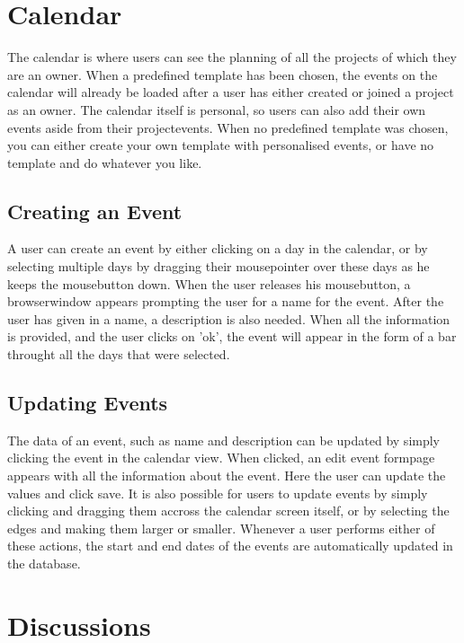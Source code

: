 \section{Calendar}

The calendar is where users can see the planning of all the projects of which they are an owner.
When a predefined template has been chosen, the events on the calendar will already be loaded after
a user has either created or joined a project as an owner. The calendar itself is personal, so users can also add their own events aside from their 
projectevents. When no predefined template was chosen, you can either
create your own template with personalised events, or have no template and do whatever you like.

\subsection{Creating an Event}

A user can create an event by either clicking on a day in the calendar, or by selecting multiple days by dragging their mousepointer over these days
as he keeps the mousebutton down. When the user releases his mousebutton, a browserwindow appears prompting the user for a name for the event. After
the user has given in a name, a description is also needed. When all the information is provided, and the user clicks on 'ok', the event will appear
in the form of a bar throught all the days that were selected.

\subsection{Updating Events}

The data of an event, such as name and description can be updated by simply clicking the event in the calendar view. When clicked, an edit event 
formpage appears with all the information about the event. Here the user can update the values and click save. It is also possible for users
to update events by simply clicking and dragging them accross the calendar screen itself, or by selecting the edges and making them larger or
smaller. Whenever a user performs either of these actions, the start and end dates of the events are automatically updated in the database.

\section{Discussions}

